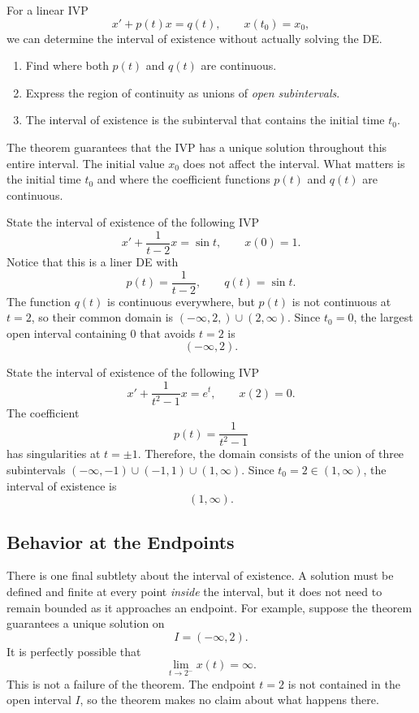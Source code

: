 \documentclass[11pt,letterpaper]{article}
\begin{document}
For a linear IVP
\[
x'+p(t)x=q(t),\qquad x(t_0)=x_0,
\]
we can determine the interval of existence without actually solving the DE.

\begin{enumerate}
    \item Find where both $p(t)$ and $q(t)$ are continuous.

    \item Express the region of continuity as unions of \textit{open subintervals}.

    \item The interval of existence is the subinterval that contains the initial time $t_0$.
\end{enumerate}
The theorem guarantees that the IVP has a unique solution throughout this
entire interval. The initial value $x_0$ does not affect the interval. What matters is the
initial time $t_0$ and where the coefficient functions $p(t)$ and $q(t)$
are continuous.
\begin{example}[3]{
State the interval of existence of the following IVP
\[
x' + \frac{1}{t-2}x = \sin t,\qquad x(0)=1.
\]
}
Notice that this is a liner DE with
\[
p(t)=\frac{1}{t-2},\qquad q(t)=\sin t.
\]
The function $q(t)$ is continuous everywhere, but $p(t)$ is not continuous at $t=2$, so their common domain is $(-\infty,2,)\cup(2,\infty)$. 
Since $t_0=0$, the largest open interval containing $0$ that avoids $t=2$ is
\[
\boxed{(-\infty,2).}
\]
\end{example}

\begin{example}[4]{    
State the interval of existence of the following IVP
\[
x' + \frac{1}{t^2-1}x = e^t,\qquad x(2)=0.
\]
}
The coefficient
\[
p(t)=\frac{1}{t^2-1}
\]
has singularities at $t=\pm 1$. Therefore, the domain consists of the union of three subintervals $(-\infty,-1)\cup (-1,1)\cup(1,\infty)$. 
Since $t_0=2 \in(1,\infty)$, the interval of existence is
\[
\boxed{(1,\infty).}
\]
\end{example}

\subsection{Behavior at the Endpoints}

There is one final subtlety about the interval of existence. A solution must
be defined and finite at every point \textit{inside} the interval, but it
does not need to remain bounded as it approaches an endpoint. For example, suppose the theorem guarantees a unique solution on
\[
I=(-\infty,2).
\]
It is perfectly possible that
\[
\lim_{t\to2^-}x(t)=\infty.
\]
This is not a failure of the theorem. The endpoint $t=2$ is not contained
in the open interval $I$, so the theorem makes no claim about what happens
there. 
\end{document}
